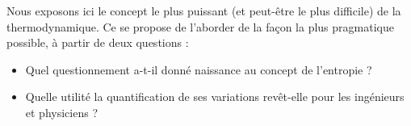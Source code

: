 Nous exposons ici le concept le plus puissant (et peut-être le plus difficile) de la thermodynamique. Ce \courshuit se propose de l’aborder de la façon la plus pragmatique possible, à partir de deux questions :
\begin{itemize}
	\item Quel questionnement a-t-il donné naissance au concept de l’entropie ?
	\item Quelle utilité la quantification de ses variations revêt-elle pour les ingénieurs et physiciens ?
\end{itemize}